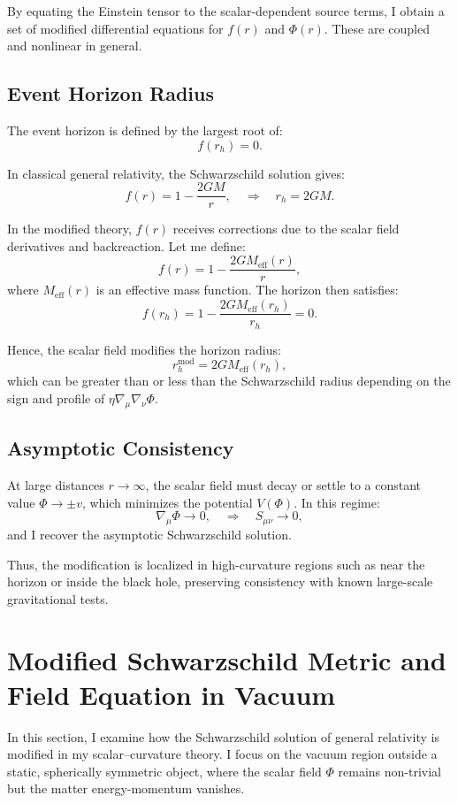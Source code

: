\documentclass[12pt]{article}
\begin{document}
By equating the Einstein tensor to the scalar-dependent source terms, I obtain a set of modified differential equations for \( f(r) \) and \( \Phi(r) \). These are coupled and nonlinear in general.

\subsection{Event Horizon Radius}

The event horizon is defined by the largest root of:
\[
f(r_h) = 0.
\]

In classical general relativity, the Schwarzschild solution gives:
\[
f(r) = 1 - \frac{2GM}{r}, \quad \Rightarrow \quad r_h = 2GM.
\]

In the modified theory, \( f(r) \) receives corrections due to the scalar field derivatives and backreaction. Let me define:
\[
f(r) = 1 - \frac{2GM_{\text{eff}}(r)}{r},
\]
where \( M_{\text{eff}}(r) \) is an effective mass function. The horizon then satisfies:
\[
f(r_h) = 1 - \frac{2GM_{\text{eff}}(r_h)}{r_h} = 0.
\]

Hence, the scalar field modifies the horizon radius:
\[
r_h^{\text{mod}} = 2GM_{\text{eff}}(r_h),
\]
which can be greater than or less than the Schwarzschild radius depending on the sign and profile of \( \eta \nabla_\mu \nabla_\nu \Phi \).

\subsection{Asymptotic Consistency}

At large distances \( r \to \infty \), the scalar field must decay or settle to a constant value \( \Phi \to \pm v \), which minimizes the potential \( V(\Phi) \). In this regime:
\[
\nabla_\mu \Phi \to 0, \quad \Rightarrow \quad S_{\mu\nu} \to 0,
\]
and I recover the asymptotic Schwarzschild solution.

Thus, the modification is localized in high-curvature regions such as near the horizon or inside the black hole, preserving consistency with known large-scale gravitational tests.

\section{Modified Schwarzschild Metric and Field Equation in Vacuum}

In this section, I examine how the Schwarzschild solution of general relativity is modified in my scalar--curvature theory. I focus on the vacuum region outside a static, spherically symmetric object, where the scalar field \( \Phi \) remains non-trivial but the matter energy-momentum vanishes.
\end{document}
